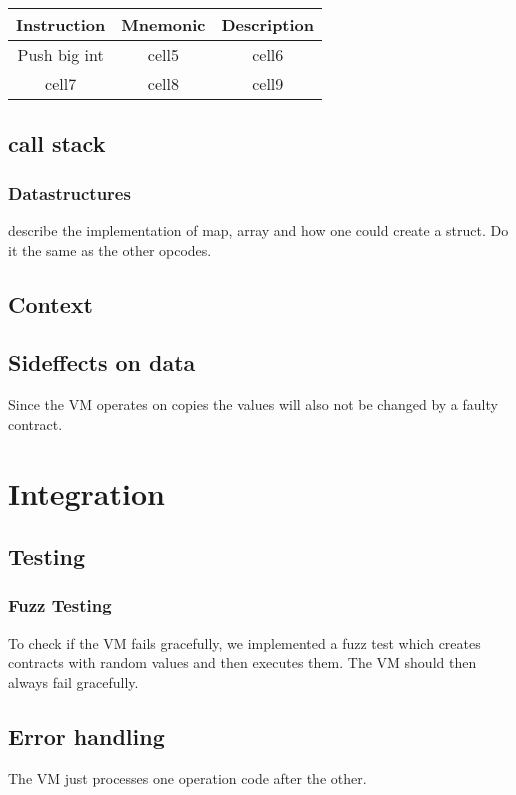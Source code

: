 \begin{center}
\begin{tabular}{ c | c | c }
 \textbf{Instruction} 	& \textbf{Mnemonic} 	& \textbf{Description} \\  \hline
 Push big int				& cell5 							& cell6 \\  
 cell7 & cell8 & cell9    
\end{tabular}
\end{center}



\subsection{call stack}

\subsubsection{Datastructures}
describe the implementation of map, array and how one could create a struct. Do it the same as the other opcodes.


\subsection{Context}

\subsection{Sideffects on data}

Since the VM operates on copies the values will also not be changed by a faulty contract.

\section{Integration}

\subsection{Testing}


\subsubsection{Fuzz Testing}
To check if the VM fails gracefully, we implemented a fuzz test which creates contracts with random values and then executes them. The VM should then always fail gracefully. 

\subsection{Error handling}
The VM just processes one operation code after the other.

